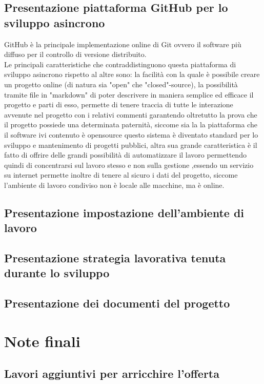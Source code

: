 \documentclass[hidelinks,12pt,a4paper]{article}
\begin{document}
\begin{flushleft}
			\subsection{Presentazione piattaforma GitHub per lo sviluppo asincrono}
			GitHub è la principale implementazione online di Git ovvero il software più diffuso per il controllo di versione distribuito.\\
			Le principali caratteristiche che contraddistinguono questa piattaforma di sviluppo asincrono rispetto al altre sono: la facilità con la quale è possibile creare un progetto online (di natura sia "open" che "closed"-source), la possibilità tramite file in "markdown" di poter descrivere in maniera semplice ed efficace il progetto e parti di esso, permette di tenere traccia di tutte le interazione avvenute nel progetto con i relativi commenti garantendo oltretutto la prova che il progetto possiede una determinata paternità, siccome sia la la piattaforma che il software ivi contenuto è opensource questo sistema è diventato standard per lo sviluppo e mantenimento di progetti pubblici, altra sua grande caratteristica è il fatto di offrire delle grandi possibilità di automatizzare il lavoro permettendo quindi di concentrarsi sul lavoro stesso e non sulla gestione ,essendo un servizio su internet permette inoltre di tenere al sicuro i dati del progetto, siccome l'ambiente di lavoro condiviso non è locale alle macchine, ma è online.\\
			\subsection{Presentazione impostazione dell'ambiente di lavoro}
			\subsection{Presentazione strategia lavorativa tenuta durante lo sviluppo}
			\subsection{Presentazione dei documenti del progetto}
		
		\section{Note finali}
			\subsection{Lavori aggiuntivi per arricchire l'offerta}
		
	\end{flushleft}
\end{document}
